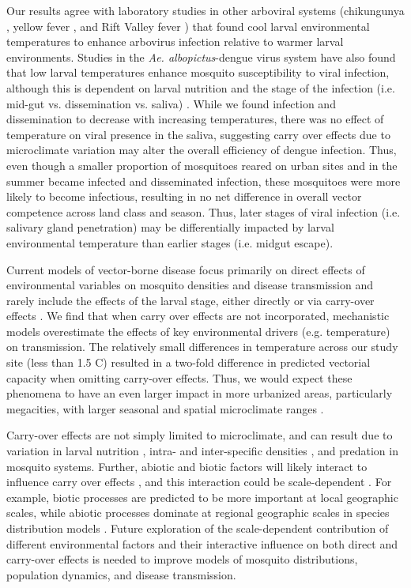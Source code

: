 \documentclass[12pt]{article}
\begin{document}
Our results agree with laboratory studies in other arboviral systems (chikungunya \citep{adelman2013}, yellow fever \citep{adelman2013}, and Rift Valley fever \citep{turell1993}) that found cool larval environmental temperatures to enhance arbovirus infection relative to warmer larval environments. Studies in the \textit{Ae. albopictus}-dengue virus system have also found that low larval temperatures enhance mosquito susceptibility to viral infection, although this is dependent on larval nutrition \citep{buckner2016} and the stage of the infection (i.e. mid-gut vs. dissemination vs. saliva) \citep{alto2013}. While we found infection and dissemination to decrease with increasing temperatures, there was no effect of temperature on viral presence in the saliva, suggesting carry over effects due to microclimate variation may alter the overall efficiency of dengue infection. Thus, even though a smaller proportion of mosquitoes reared on urban sites and in the summer became infected and disseminated infection, these mosquitoes were more likely to become infectious, resulting in no net difference in overall vector competence across land class and season. Thus, later stages of viral infection (i.e. salivary gland penetration) may be differentially impacted by larval environmental temperature than earlier stages (i.e. midgut escape).

Current  models of vector-borne disease focus primarily on direct effects of environmental variables on mosquito densities and disease transmission and rarely include the effects of the larval stage, either directly or via carry-over effects \citep{mordecai2017,ezeakacha2015}. We find that when carry over effects are not incorporated, mechanistic models overestimate the effects of key environmental drivers (e.g. temperature) on transmission. The relatively small differences in temperature across our study site (less than 1.5 \degree C) resulted in a two-fold difference in predicted vectorial capacity when omitting carry-over effects. Thus, we would expect these phenomena to have an even larger impact in more urbanized areas, particularly megacities, with larger seasonal and spatial microclimate ranges \citep{peng2012}.

Carry-over effects are not simply limited to microclimate, and can result due to variation in larval nutrition \citep{moller-jacobs2014}, intra- and inter-specific densities \citep{ alto2005, alto2008}, and predation \citep{roux2015a} in mosquito systems. Further, abiotic and biotic factors will likely interact to influence carry over effects \citep{buckner2016, muturi2011d, muturi2012a}, and this interaction could be scale-dependent \citep{leisnham2014}. For example, biotic processes are predicted to be more important at local geographic scales, while abiotic processes dominate at regional geographic scales in species distribution models \citep{cohen2016}. Future exploration of the scale-dependent contribution of different environmental factors and their interactive influence on both direct and carry-over effects is needed to improve models of mosquito distributions, population dynamics, and disease transmission.
\end{document}
